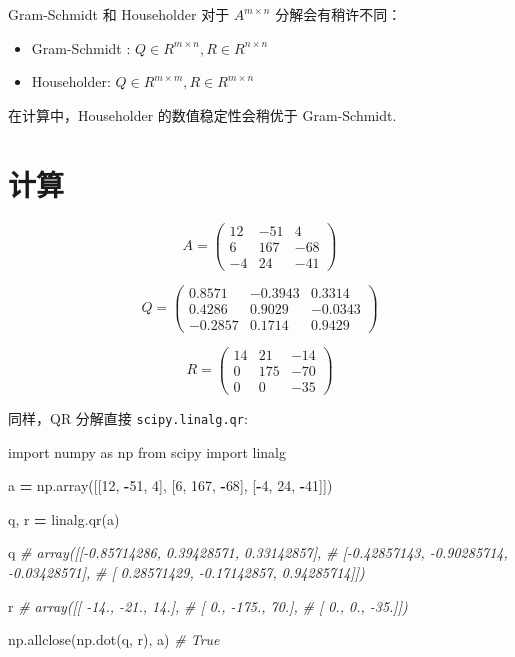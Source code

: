\documentclass[
]{book}
\newenvironment{Shaded}{\begin{snugshade}}{\end{snugshade}}
\newcommand{\CommentTok}[1]{\textcolor[rgb]{0.56,0.35,0.01}{\textit{#1}}}
\newcommand{\DecValTok}[1]{\textcolor[rgb]{0.00,0.00,0.81}{#1}}
\newcommand{\ImportTok}[1]{#1}
\newcommand{\NormalTok}[1]{#1}
\newcommand{\OperatorTok}[1]{\textcolor[rgb]{0.81,0.36,0.00}{\textbf{#1}}}
\providecommand{\tightlist}{%
  \setlength{\itemsep}{0pt}\setlength{\parskip}{0pt}}
\begin{document}
Gram-Schmidt 和 Householder 对于 \(A^{m \times n}\) 分解会有稍许不同：

\begin{itemize}
\tightlist
\item
  Gram-Schmidt : \(Q \in R^{m \times n}, R \in R^{n \times n}\)
\item
  Householder: \(Q \in R^{m \times m}, R \in R^{m \times n}\)
\end{itemize}

在计算中，Householder 的数值稳定性会稍优于 Gram-Schmidt.

\hypertarget{ux8ba1ux7b97-2}{%
\section{计算}\label{ux8ba1ux7b97-2}}

\[
A={\begin{pmatrix}12&-51&4\\6&167&-68\\-4&24&-41\end{pmatrix}}
\]

\[
Q={\begin{pmatrix}0.8571&-0.3943&0.3314\\0.4286&0.9029&-0.0343\\-0.2857&0.1714&0.9429\end{pmatrix}}\]

\[
R= \begin{pmatrix}14&21&-14\\0&175&-70\\0&0&-35\end{pmatrix}
\]

同样，QR 分解直接 \texttt{scipy.linalg.qr}:

\begin{Shaded}
\begin{Highlighting}[]
\ImportTok{import}\NormalTok{ numpy }\ImportTok{as}\NormalTok{ np}
\ImportTok{from}\NormalTok{ scipy }\ImportTok{import}\NormalTok{ linalg}

\NormalTok{a }\OperatorTok{=}\NormalTok{ np.array([[}\DecValTok{12}\NormalTok{, }\OperatorTok{{-}}\DecValTok{51}\NormalTok{, }\DecValTok{4}\NormalTok{],}
\NormalTok{              [}\DecValTok{6}\NormalTok{, }\DecValTok{167}\NormalTok{, }\OperatorTok{{-}}\DecValTok{68}\NormalTok{],}
\NormalTok{              [}\OperatorTok{{-}}\DecValTok{4}\NormalTok{, }\DecValTok{24}\NormalTok{, }\OperatorTok{{-}}\DecValTok{41}\NormalTok{]])}
              
\NormalTok{q, r }\OperatorTok{=}\NormalTok{ linalg.qr(a)}

\NormalTok{q}
\CommentTok{\# array([[{-}0.85714286,  0.39428571,  0.33142857],}
\CommentTok{\#       [{-}0.42857143, {-}0.90285714, {-}0.03428571],}
\CommentTok{\#       [ 0.28571429, {-}0.17142857,  0.94285714]])}

\NormalTok{r }
\CommentTok{\# array([[ {-}14.,  {-}21.,   14.],}
\CommentTok{\#       [   0., {-}175.,   70.],}
\CommentTok{\#       [   0.,    0.,  {-}35.]])}

\NormalTok{np.allclose(np.dot(q, r), a) }\CommentTok{\# True}
\end{Highlighting}
\end{Shaded}
\end{document}
